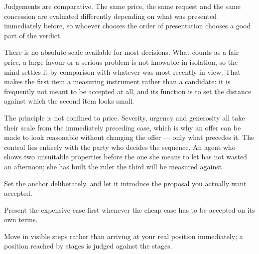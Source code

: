


\begin{core}
Judgements are comparative. The same price, the same request and the same concession are evaluated differently depending on what was presented immediately before, so whoever chooses the order of presentation chooses a good part of the verdict.
\end{core}

\begin{mechanism}
There is no absolute scale available for most decisions. What counts as a fair price, a large favour or a serious problem is not knowable in isolation, so the mind settles it by comparison with whatever was most recently in view. That makes the first item a measuring instrument rather than a candidate: it is frequently not meant to be accepted at all, and its function is to set the distance against which the second item looks small.

The principle is not confined to price. Severity, urgency and generosity all take their scale from the immediately preceding case, which is why an offer can be made to look reasonable without changing the offer --- only what precedes it. The control lies entirely with the party who decides the sequence.
An agent who shows two unsuitable properties before the one she means to let has not wasted an afternoon; she has built the ruler the third will be measured against.
\end{mechanism}


\begin{application}
  \item Set the anchor deliberately, and let it introduce the proposal you actually want accepted.
  \item Present the expensive case first whenever the cheap case has to be accepted on its own terms.
  \item Move in visible steps rather than arriving at your real position immediately; a position reached by stages is judged against the stages.
\end{application}

